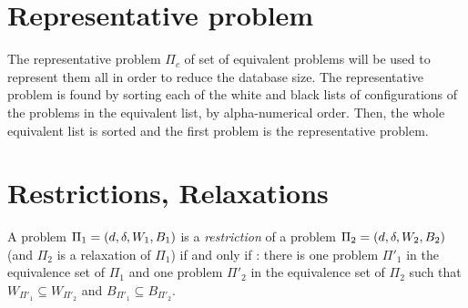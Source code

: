 \section{Representative problem}
The representative problem $\Pi_c$ of set of equivalent problems will be used to represent them all in order to reduce the database size. The representative problem is found by sorting each of the white and black lists of configurations of the problems in the equivalent list, by alpha-numerical order. Then, the whole equivalent list is sorted and the first problem is the representative problem.
\section{Restrictions, Relaxations}
A problem $\Pi_1 = (d,\delta,W_1,B_1)$ is a \textit{restriction} of a problem $\Pi_2 = (d,\delta,W_2,B_2)$ (and $\Pi_2$ is a relaxation of $\Pi_1$) if and only if : there is one problem $\Pi'_1$ in the equivalence set of $\Pi_1$ and one problem $\Pi'_2$ in the equivalence set of $\Pi_2$ such that $W_{\Pi'_1}\subseteq W_{\Pi'_2}$ and $B_{\Pi'_1}\subseteq B_{\Pi'_2}$.